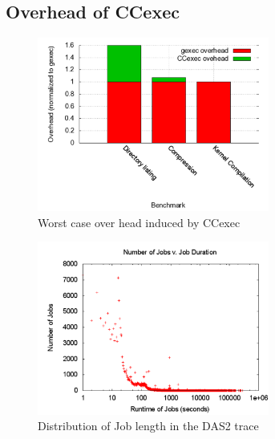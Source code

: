 \subsection{Overhead of CCexec} %
\label{sub:overhead_of_ccexec}
\begin{figure}[ht]
\centering
\begin{center}
\includegraphics[width=3.0in]{graphs/CCexecVsgexec1.pdf}
\vspace{-0.1in}
\caption{{\normalsize Worst case over head induced by CCexec}\label{fig:ccexec-overhead}}
\vspace{-0.1in}
\end{center}
\end{figure}
\begin{figure}[ht]
\centering
\begin{center}
\includegraphics[width=3.0in]{graphs/joblength1.pdf}
\vspace{-0.1in}
\caption{{\normalsize Distribution of Job length in the DAS2 trace}\label{fig:joblength-trace}}
\vspace{-0.1in}
\end{center}
\end{figure}
